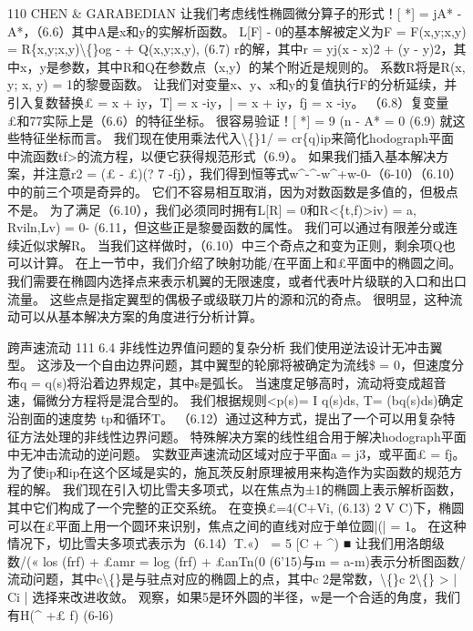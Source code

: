 \documentclass[UTF8,11pt,a4paper,openany,fontset=fandol]{ctexbook}
\begin{document}
110 CHEN \& GARABEDIAN 让我们考虑线性椭圆微分算子的形式！[ *] = jA* - A*，（6.6）其中A是x和y的实解析函数。 L[F] - 0的基本解被定义为F = F(x,y;x,y) = R\{x,y;x,y)\textbackslash\{\}og - + Q(x,y;x,y), (6.7) r的解，其中r = yj(x - x)2 + (y - y)2，其中x，y是参数，其中R和Q在参数点（x,y）的某个附近是规则的。 系数R将是R(x, y; x, y) = 1的黎曼函数。 让我们对变量x、y、x和y的复值执行F的分析延续，并引入复数替换£ = x + iy，T] = x -iy，| = x + iy，fj = x -iy。 （6.8）复变量£和77实际上是（6.6）的特征坐标。 很容易验证！[ *] = 9 (n - A* = 0 (6.9) 就这些特征坐标而言。 我们现在使用乘法代入\textbackslash\{\}1/ = cr\{q)ip来简化hodograph平面中流函数tf>的流方程，以便它获得规范形式（6.9）。 如果我们插入基本解决方案，并注意r2 = (£ - £)(? 7 -fj），我们得到恒等式w\textasciicircum{}-\textasciicircum{}-w\textasciicircum{}+w-0-（6-10）（6.10）中的前三个项是奇异的。 它们不容易相互取消，因为对数函数是多值的，但极点不是。 为了满足（6.10），我们必须同时拥有L[R] = 0和R<\{t,f)>iv) = a, Rviln,Lv) = 0- (6.11，但这些正是黎曼函数的属性。 我们可以通过有限差分或连续近似求解R。 当我们这样做时，（6.10）中三个奇点之和变为正则，剩余项Q也可以计算。 在上一节中，我们介绍了映射功能/在平面上和£平面中的椭圆之间。 我们需要在椭圆内选择点来表示机翼的无限速度，或者代表叶片级联的入口和出口流量。 这些点是指定翼型的偶极子或级联刀片的源和沉的奇点。 很明显，这种流动可以从基本解决方案的角度进行分析计算。

跨声速流动 111 6.4 非线性边界值问题的复杂分析 我们使用逆法设计无冲击翼型。 这涉及一个自由边界问题，其中翼型的轮廓将被确定为流线\$ = 0，但速度分布q = q(s)将沿着边界规定，其中s是弧长。 当速度足够高时，流动将变成超音速，偏微分方程将是混合型的。 我们根据规则<p(s)= I q(s)ds, T= (bq(s)ds)确定沿剖面的速度势 tp和循环T。 （6.12）通过这种方式，提出了一个可以用复杂特征方法处理的非线性边界问题。 特殊解决方案的线性组合用于解决hodograph平面中无冲击流动的逆问题。 实数亚声速流动区域对应于平面a = j3，或平面£ = fj。 为了使ip和ip在这个区域是实的，施瓦茨反射原理被用来构造作为实函数的规范方程的解。 我们现在引入切比雪夫多项式，以在焦点为±1的椭圆上表示解析函数，其中它们构成了一个完整的正交系统。 在变换£=4(C+Vi, (6.13) 2 V C)下，椭圆可以在£平面上用一个圆环来识别，焦点之间的直线对应于单位圆|(| = 1。 在这种情况下，切比雪夫多项式表示为（6.14）T.«） = 5 [C + \textasciicircum{}) ■ 让我们用洛朗级数/(« los (frf) + £amr = log (frf) + £anTn(0 (6'15)与m = a-m)表示分析图函数/流动问题，其中c\textbackslash\{\}是与驻点对应的椭圆上的点，其中c 2是常数，\textbackslash\{\}c 2\textbackslash\{\} > | Ci | 选择来改进收敛。 观察，如果5是环外圆的半径，w是一个合适的角度，我们有H(\textasciicircum{} +£ f) (6-l6)
\end{document}

